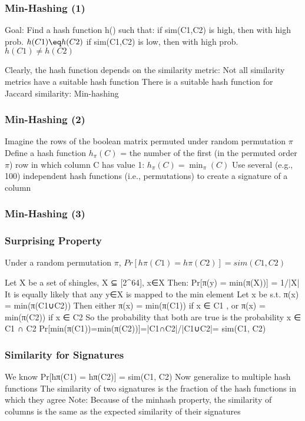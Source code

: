 \documentclass[svgnames]{beamer}
\begin{document}
  
\begin{frame} \frametitle{Min-Hashing (1)}

Goal: Find a hash function h() such that:
  if sim(C1,C2) is high, then with high prob. $h(C1) \eq h(C2)$
  if sim(C1,C2) is low, then with high prob. $h(C1) \neq h(C2)$

Clearly, the hash function depends on the similarity metric:
  Not all similarity metrics have a suitable hash function
  There is a suitable hash function for Jaccard similarity: Min-hashing
  
\end{frame}

  
\begin{frame} \frametitle{Min-Hashing (2)}

Imagine the rows of the boolean matrix permuted under random permutation $\pi$
Define a hash function $h_\pi(C)$ = the number of the first (in the permuted order $\pi$) row in which column C has value 1:
  $h_\pi (C) = \min_\pi(C)$
Use several (e.g., 100) independent hash functions (i.e., permutations) to create a signature of a column

\end{frame}

  
\begin{frame} \frametitle{Min-Hashing (3)}


\end{frame}

  
\begin{frame} \frametitle{Surprising Property}

Under a random permutation $\pi$, $Pr[hπ(C1) = hπ(C2)] = sim(C1, C2)$

Let X be a set of shingles, X ⊆ [2^{64}], x∈X
Then: Pr[π(y) = min(π(X))] = 1/|X|
  It is equally likely that any y∈X is mapped to the min element
Let x be s.t. π(x) = min(π(C1∪C2))
Then either π(x) = min(π(C1)) if x ∈ C1 , or π(x) = min(π(C2)) if x ∈ C2
So the probability that both are true is the probability x ∈ C1 ∩ C2
Pr[min(π(C1))=min(π(C2))]=|C1∩C2|/|C1∪C2|= sim(C1, C2)

\end{frame}

  
\begin{frame} \frametitle{Similarity for Signatures}

We know Pr[hπ(C1) = hπ(C2)] = sim(C1, C2)
Now generalize to multiple hash functions
The similarity of two signatures is the fraction of the hash functions in which they agree
Note: Because of the minhash property, the similarity of columns is the same as the expected similarity of their signatures

\end{frame}
\end{document}
